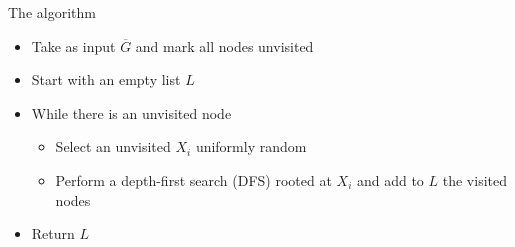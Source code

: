 	\begin{frame}
		\begin{block}{The algorithm}
			\begin{itemize}
				\item Take as input $\overline G$ and mark all nodes unvisited
				\item Start with an empty list $L$
				\item While there is an unvisited node
				\begin{itemize}
					\item Select an unvisited $X_i$ uniformly random
					\item Perform a depth-first search (DFS) rooted at $X_i$ and add to $L$ the visited nodes
				\end{itemize}
				\item Return $L$
			\end{itemize}
		\end{block}
	\end{frame}